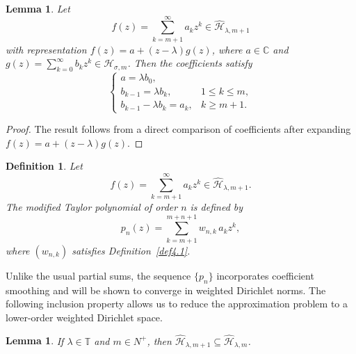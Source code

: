 \documentclass[12pt,reqno]{amsart}
\newtheorem{lemma}[theorem]{Lemma}
\newtheorem{definition}[theorem]{Definition}
\begin{document}
\begin{lemma}\label{lm4.2}
Let
\[
f(z)=\sum_{k=m+1}^{\infty} a_k z^k \in \widehat{\mathcal{H}}_{\lambda,m+1}
\]
with representation $f(z)=a+(z-\lambda)g(z)$,
where $a\in\mathbb{C}$ and $g(z)=\sum_{k=0}^{\infty} b_k z^k \in \mathcal{H}_{\sigma,m}$.
Then the coefficients satisfy
\[
\begin{cases}
a=\lambda b_0,\\
b_{k-1}=\lambda b_k, & 1\le k\le m,\\
b_{k-1}-\lambda b_k=a_k, & k\ge m+1.
\end{cases}
\]
\end{lemma}
\begin{proof}
The result follows from a direct comparison of coefficients after expanding
$f(z)=a+(z-\lambda)g(z)$.
\end{proof}

\begin{definition}\label{def4.3}
Let
\[
f(z)=\sum_{k=m+1}^{\infty} a_k z^k \in \widehat{\mathcal{H}}_{\lambda,m+1}.
\]
The \emph{modified Taylor polynomial} of order $n$ is defined by
\[
p_n(z)=\sum_{k=m+1}^{m+n+1} w_{n,k}\, a_k z^k,
\]
where $(w_{n,k})$ satisfies Definition~\ref{def4.1}.
\end{definition}

Unlike the usual partial sums, the sequence $\{p_n\}$ incorporates coefficient smoothing
and will be shown to converge in weighted Dirichlet norms. The following inclusion property allows us to reduce the approximation problem
to a lower-order weighted Dirichlet space.

\begin{lemma}\label{lm4.4}
If $\lambda \in \mathbb{T}$ and $m \in {N^ + }$, then $ \widehat{\mathcal{H}}_{\lambda, m+1 } \subseteq \widehat{\mathcal{H}}_{\lambda, m }$.
\end{lemma}
\end{document}
